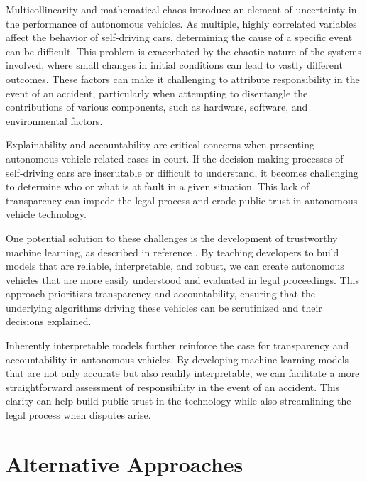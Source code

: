 Multicollinearity and mathematical chaos introduce an element of uncertainty in the performance of autonomous vehicles. As multiple, highly correlated variables affect the behavior of self-driving cars, determining the cause of a specific event can be difficult. This problem is exacerbated by the chaotic nature of the systems involved, where small changes in initial conditions can lead to vastly different outcomes. These factors can make it challenging to attribute responsibility in the event of an accident, particularly when attempting to disentangle the contributions of various components, such as hardware, software, and environmental factors.

Explainability and accountability are critical concerns when presenting autonomous vehicle-related cases in court. If the decision-making processes of self-driving cars are inscrutable or difficult to understand, it becomes challenging to determine who or what is at fault in a given situation. This lack of transparency can impede the legal process and erode public trust in autonomous vehicle technology.

One potential solution to these challenges is the development of trustworthy machine learning, as described in reference \cite{trustworthyml}. By teaching developers to build models that are reliable, interpretable, and robust, we can create autonomous vehicles that are more easily understood and evaluated in legal proceedings. This approach prioritizes transparency and accountability, ensuring that the underlying algorithms driving these vehicles can be scrutinized and their decisions explained. 

Inherently interpretable models further reinforce the case for transparency and accountability in autonomous vehicles. By developing machine learning models that are not only accurate but also readily interpretable, we can facilitate a more straightforward assessment of responsibility in the event of an accident. This clarity can help build public trust in the technology while also streamlining the legal process when disputes arise.

\section{Alternative Approaches}

